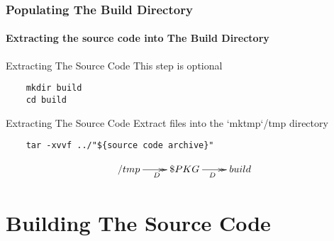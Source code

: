 \documentclass[12pt,hyperref={pdfpagelabels=true}]{beamer}
\begin{document}
\begin{frame}[fragile]
  \frametitle{Populating The Build Directory}
  \framesubtitle{Extracting the source code into The Build Directory}
  \lstset{language=sh}
  
  \pause
  
  \begin{alertblock}{Extracting The Source Code}
    This step is optional
  \end{alertblock}
  
  \pause
  
  \begin{lstlisting}
    mkdir build
    cd build
  \end{lstlisting}
  
  \pause
  
  \begin{block}{Extracting The Source Code}
    Extract files into the `mktmp`/tmp directory
  \end{block}
  
  \pause
  
  \begin{lstlisting}
    tar -xvvf ../"${source code archive}"
  \end{lstlisting}

  \pause

  \begin{equation*}
    \xymatrix@C=2pc@R=2pc{
      \//tmp\ar@{->>}[r]_D & \/\$PKG\ar@{->>}[r]_D & \/build}
  \end{equation*}
\end{frame}

\section{Building The Source Code}
\end{document}
